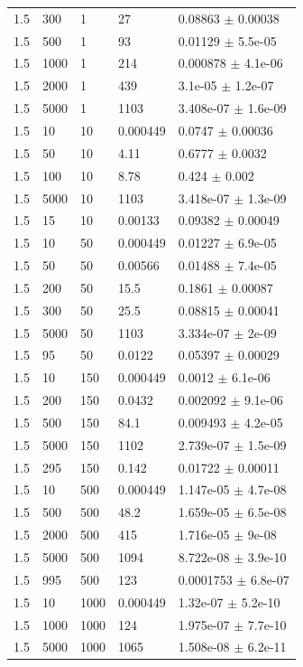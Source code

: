 \begin{longtable}{lllll}
	1.5 & 300 & 1 & 27 & 0.08863 $\pm$ 0.00038 \\
	1.5 & 500 & 1 & 93 & 0.01129 $\pm$ 5.5e-05 \\
	1.5 & 1000 & 1 & 214 & 0.000878 $\pm$ 4.1e-06 \\
	1.5 & 2000 & 1 & 439 & 3.1e-05 $\pm$ 1.2e-07 \\
	1.5 & 5000 & 1 & 1103 & 3.408e-07 $\pm$ 1.6e-09 \\
	1.5 & 10 & 10 & 0.000449 & 0.0747 $\pm$ 0.00036 \\
	1.5 & 50 & 10 & 4.11 & 0.6777 $\pm$ 0.0032 \\
	1.5 & 100 & 10 & 8.78 & 0.424 $\pm$ 0.002 \\
	1.5 & 5000 & 10 & 1103 & 3.418e-07 $\pm$ 1.3e-09 \\
	1.5 & 15 & 10 & 0.00133 & 0.09382 $\pm$ 0.00049 \\
	1.5 & 10 & 50 & 0.000449 & 0.01227 $\pm$ 6.9e-05 \\
	1.5 & 50 & 50 & 0.00566 & 0.01488 $\pm$ 7.4e-05 \\
	1.5 & 200 & 50 & 15.5 & 0.1861 $\pm$ 0.00087 \\
	1.5 & 300 & 50 & 25.5 & 0.08815 $\pm$ 0.00041 \\
	1.5 & 5000 & 50 & 1103 & 3.334e-07 $\pm$ 2e-09 \\
	1.5 & 95 & 50 & 0.0122 & 0.05397 $\pm$ 0.00029 \\
	1.5 & 10 & 150 & 0.000449 & 0.0012 $\pm$ 6.1e-06 \\
	1.5 & 200 & 150 & 0.0432 & 0.002092 $\pm$ 9.1e-06 \\
	1.5 & 500 & 150 & 84.1 & 0.009493 $\pm$ 4.2e-05 \\
	1.5 & 5000 & 150 & 1102 & 2.739e-07 $\pm$ 1.5e-09 \\
	1.5 & 295 & 150 & 0.142 & 0.01722 $\pm$ 0.00011 \\
	1.5 & 10 & 500 & 0.000449 & 1.147e-05 $\pm$ 4.7e-08 \\
	1.5 & 500 & 500 & 48.2 & 1.659e-05 $\pm$ 6.5e-08 \\
	1.5 & 2000 & 500 & 415 & 1.716e-05 $\pm$ 9e-08 \\
	1.5 & 5000 & 500 & 1094 & 8.722e-08 $\pm$ 3.9e-10 \\
	1.5 & 995 & 500 & 123 & 0.0001753 $\pm$ 6.8e-07 \\
	1.5 & 10 & 1000 & 0.000449 & 1.32e-07 $\pm$ 5.2e-10 \\
	1.5 & 1000 & 1000 & 124 & 1.975e-07 $\pm$ 7.7e-10 \\
	1.5 & 5000 & 1000 & 1065 & 1.508e-08 $\pm$ 6.2e-11 \\

\end{longtable}
